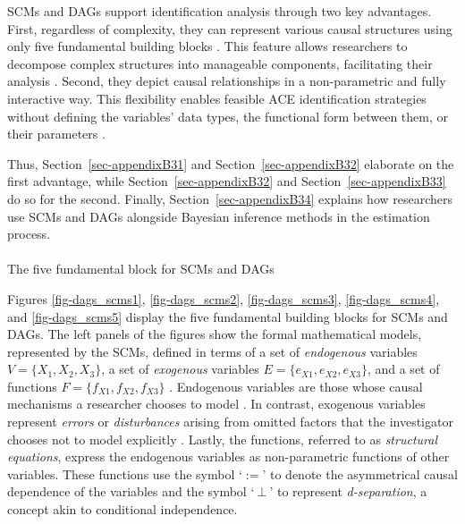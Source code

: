 \documentclass[
  authoryear,
  review,
  1p]{elsarticle}
\makeatletter
\let\oldparagraph\paragraph
\renewcommand{\paragraph}{
    \@ifstar
      \xxxParagraphStar
      \xxxParagraphNoStar
  }
\newcommand{\xxxParagraphStar}[1]{\oldparagraph*{#1}\mbox{}}
\newcommand{\xxxParagraphNoStar}[1]{\oldparagraph{#1}\mbox{}}
\makeatother
\begin{document}
SCMs and DAGs support identification analysis through two key
advantages. First, regardless of complexity, they can represent various
causal structures using only five fundamental building blocks
\citep{Neal_2020, McElreath_2020}. This feature allows researchers to
decompose complex structures into manageable components, facilitating
their analysis \citep{McElreath_2020}. Second, they depict causal
relationships in a non-parametric and fully interactive way. This
flexibility enables feasible ACE identification strategies without
defining the variables' data types, the functional form between them, or
their parameters \citep[p.~35]{Pearl_et_al_2016}.

Thus, Section~\ref{sec-appendixB31} and Section~\ref{sec-appendixB32}
elaborate on the first advantage, while Section~\ref{sec-appendixB32}
and Section~\ref{sec-appendixB33} do so for the second. Finally,
Section~\ref{sec-appendixB34} explains how researchers use SCMs and DAGs
alongside Bayesian inference methods in the estimation process.

\paragraph{The five fundamental block for SCMs and
DAGs}\label{sec-appendixB31}

Figures \ref{fig-dags_scms1}, \ref{fig-dags_scms2},
\ref{fig-dags_scms3}, \ref{fig-dags_scms4}, and \ref{fig-dags_scms5}
display the five fundamental building blocks for SCMs and DAGs. The left
panels of the figures show the formal mathematical models, represented
by the SCMs, defined in terms of a set of \emph{endogenous} variables
\(V=\{X_{1},X_{2},X_{3}\}\), a set of \emph{exogenous} variables
\(E=\{e_{X1},e_{X2},e_{X3}\}\), and a set of functions
\(F=\{f_{X1},f_{X2},f_{X3}\}\) \citep{Pearl_2009, Cinelli_et_al_2020}.
Endogenous variables are those whose causal mechanisms a researcher
chooses to model \citep{Neal_2020}. In contrast, exogenous variables
represent \emph{errors} or \emph{disturbances} arising from omitted
factors that the investigator chooses not to model explicitly
\citep[p.~27,68]{Pearl_2009}. Lastly, the functions, referred to as
\emph{structural equations}, express the endogenous variables as
non-parametric functions of other variables. These functions use the
symbol `\(:=\)' to denote the asymmetrical causal dependence of the
variables and the symbol `\(\:\bot\:\)' to represent
\emph{d-separation}, a concept akin to conditional independence.
\end{document}
